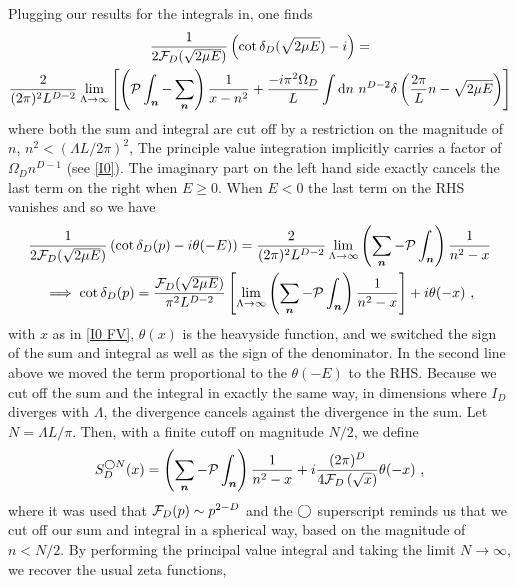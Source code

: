 Plugging our results for the integrals in, one finds
\begin{multline}
    \frac{1}{2\mathcal{F}_{D}(\sqrt{2\mu E})}\left(\cot \delta_{D}(\sqrt{2\mu E}) - i\right)
    =\\
    \frac{2}{(2\pi)^2 L^{D-2}}
    \lim\limits_{\Lambda \to \infty}
    \left[
    	\left(\mathcal{P}\int_{\boldsymbol{n}} - \sum_{\boldsymbol{n}}\right) \frac{1}{x-n^2} +
		\frac{-i \pi^2\Omega_D}{L} \int \mathrm{d}n\ n^{D-2} \delta\left(\frac{2\pi}{L}n - \sqrt{2\mu E}\right)
	\right]
\end{multline}
where both the sum and integral are cut off by a restriction on the magnitude of $n$, $n^2 < (\Lambda L / 2\pi)^2$,
The principle value integration implicitly carries a factor of $\Omega_D n^{D-1}$ (see \eqref{I0}).
The imaginary part on the left hand side exactly cancels the last term on the right when $E\ge0$.  When $E<0$ the last term on the RHS vanishes and so we have
\begin{multline}\label{eq:general luscher}
   \frac{1}{2\mathcal{F}_{D}(\sqrt{2\mu E})}  \left( \cot \delta_{D}(p)-i\theta(-E)\right)
    =
   \frac{2}{(2\pi)^2 L^{D-2}}
    \lim\limits_{\Lambda \to \infty}\left(\sum_{\boldsymbol{n}}-\mathcal{P}\int_{\boldsymbol{n}}\right) \frac{1}{n^2-x}\\
    \implies
      \cot \delta_{D}(p)= \frac{\mathcal{F}_{D}(\sqrt{2\mu E})}{\pi^2 L^{D-2}}\left[
    \lim\limits_{\Lambda \to \infty}\left(\sum_{\boldsymbol{n}}-\mathcal{P}\int_{\boldsymbol{n}}\right) \frac{1}{n^2-x}\right]
    +i\theta(-x)
    \ ,
\end{multline}
with $x$ as in \eqref{I0 FV}, $\theta(x)$ is the heavyside function, and we switched the sign of the sum and integral as well as the sign of the denominator.  In the second line above we moved the term proportional to the $\theta(-E)$ to the RHS.
Because we cut off the sum and the integral in exactly the same way, in dimensions where $I_D$ diverges with $\Lambda$, the divergence cancels against the divergence in the sum.
Let $N=\Lambda L/\pi$.
Then, with a finite cutoff on magnitude $N/2$, we define
\begin{equation}\label{eq:spherical cutoff S}
    S^{\spherical N}_D(x) =
    \left(\sum_{\vec{n}}- \mathcal{P}\int_{\vec{n}}\right) \frac{1}{n^2-x}
    + i \frac{(2\pi)^D}{4 \F_D\left(\sqrt{x}\right)}\theta(-x)\ ,
\end{equation}
where it was used that $\mathcal{F}_D(p) \sim p^{2-D}$ and the $\bigcirc$ superscript reminds us that we cut off our sum and integral in a spherical way, based on the magnitude of $n<N/2$.   By performing the principal value integral and taking the limit $N\to \infty$, we recover the usual \Luscher zeta functions,
